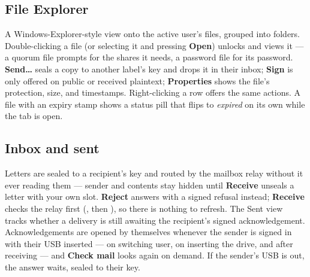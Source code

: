 
\subsection{File Explorer}

A Windows-Explorer-style view onto the active user's files, grouped into
folders. Double-clicking a file (or selecting it and pressing
\textbf{Open}) unlocks and views it --- a quorum file prompts for the
shares it needs, a password file for its password. \textbf{Send\ldots}
seals a copy to another label's key and drops it in their inbox;
\textbf{Sign} is only offered on public or received plaintext;
\textbf{Properties} shows the file's protection, size, and timestamps.
Right-clicking a row offers the same actions. A file with an expiry stamp
shows a status pill that flips to \emph{expired} on its own while the tab
is open.


\subsection{Inbox and sent}

Letters are sealed to a recipient's key and routed by the mailbox relay
without it ever reading them --- sender and contents stay hidden until
\textbf{Receive} unseals a letter with your own slot. \textbf{Reject}
answers with a signed refusal instead; \textbf{Receive} checks the relay
first (, then ), so there is
nothing to refresh. The Sent view tracks whether a delivery is still
awaiting the recipient's signed acknowledgement. Acknowledgements are
opened by themselves whenever the sender is signed in with their USB
inserted --- on switching user, on inserting the drive, and after
receiving --- and \textbf{Check mail} looks again on demand. If the sender's
USB is out, the answer waits, sealed to their key.

